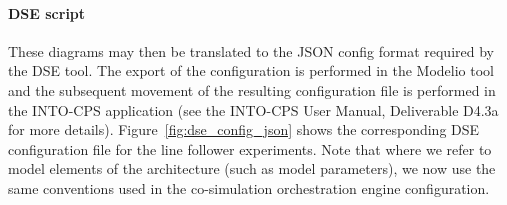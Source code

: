 \paragraph{DSE script}


These diagrams may then be translated to the JSON config format required by the DSE tool.  The export of the configuration is performed in the Modelio tool and the subsequent movement of the resulting configuration file is performed in the INTO-CPS application (see the INTO-CPS User Manual, Deliverable D4.3a~\cite{INTOCPSD4.3a} for more details).  %
Figure~\ref{fig:dse_config_json} shows the corresponding DSE configuration file for the line follower experiments. Note that where we refer to model elements of the architecture (such as model parameters), we now use the same conventions used in the co-simulation orchestration engine configuration.

